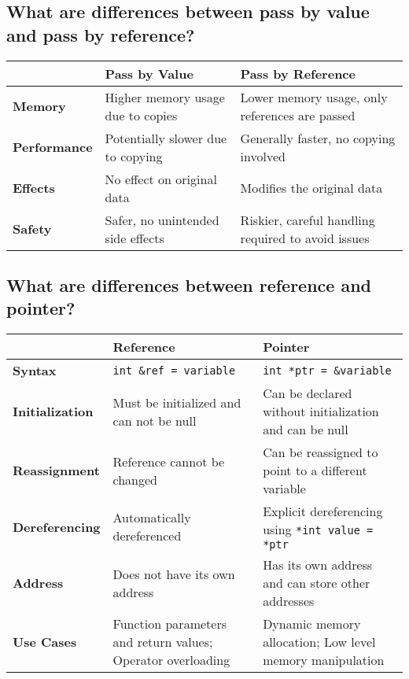\subsection{What are differences between pass by value and pass by reference?}
\begin{table}[H]
    \centering
    \begin{tabularx}{\textwidth}{|p{2.5cm}|X|X|}
    \hline \rowcolor{tableheader}
    \textbf{}                    & \textbf{Pass by Value}            & \textbf{Pass by Reference} \\
    \hline \textbf{Memory}       & Higher memory usage due to copies & Lower memory usage, only references are passed \\
    \hline \textbf{Performance}  & Potentially slower due to copying & Generally faster, no copying involved \\
    \hline \textbf{Effects}      & No effect on original data        & Modifies the original data \\
    \hline \textbf{Safety}       & Safer, no unintended side effects & Riskier, careful handling required to avoid issues \\
    \hline
    \end{tabularx}
\end{table}

\subsection{What are differences between reference and pointer?}
\begin{table}[H]
    \centering
    \begin{tabularx}{\textwidth}{|p{2.5cm}|X|X|}
    \hline \rowcolor{tableheader}
    \textbf{}                      & \textbf{Reference}                      & \textbf{Pointer} \\
    \hline \textbf{Syntax}         & \texttt{int \&ref = variable}           & \texttt{int *ptr = \&variable} \\
    \hline \textbf{Initialization} & Must be initialized and can not be null & Can be declared without initialization and can be null \\
    \hline \textbf{Reassignment}   & Reference cannot be changed             & Can be reassigned to point to a different variable \\
    \hline \textbf{Dereferencing}  & Automatically dereferenced              & Explicit dereferencing using \texttt{*int value = *ptr} \\
    \hline \textbf{Address}        & Does not have its own address           & Has its own address and can store other addresses \\
    \hline \textbf{Use Cases}      & Function parameters and return values; Operator overloading   & Dynamic memory allocation; Low level memory manipulation \\
    \hline 
    \end{tabularx}
\end{table}

